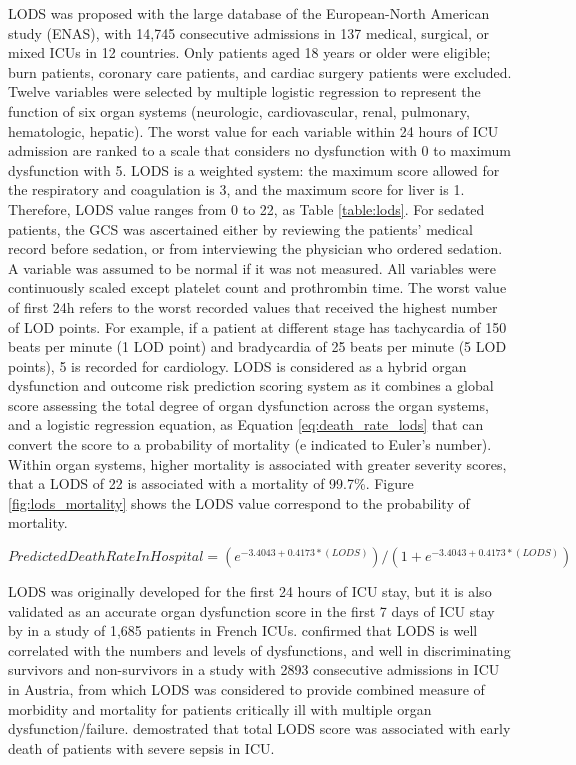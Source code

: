 \documentclass[12pt,a4paper,english
]{tunithesis}
\begin{document}
LODS was proposed with the large database of the European-North American study (ENAS), with 14,745 consecutive admissions in 137 medical, surgical, or mixed ICUs in 12 countries. Only patients aged 18 years or older were eligible; burn patients, coronary care patients, and cardiac surgery patients were excluded. Twelve variables were selected by multiple logistic regression to represent the function of six organ systems (neurologic, cardiovascular, renal, pulmonary, hematologic, hepatic). The worst value for each variable within 24 hours of ICU admission are ranked to a scale that considers no dysfunction with 0 to maximum dysfunction with 5. LODS is a weighted system: the maximum score allowed for the respiratory and coagulation is 3, and the maximum score for liver is 1. Therefore, LODS value ranges from 0 to 22, as Table \ref{table:lods}. For sedated patients, the GCS was ascertained either by reviewing the patients' medical record before sedation, or from interviewing the physician who ordered sedation. A variable was assumed to be normal if it was not measured. All variables were continuously scaled except platelet count and prothrombin time. The worst value of first 24h refers to the worst recorded values that received the highest number of LOD points. For example, if a patient at different stage has tachycardia of 150 beats per minute (1 LOD point) and bradycardia of 25 beats per minute (5 LOD points), 5 is recorded for cardiology. LODS is considered as a hybrid organ dysfunction and outcome risk prediction scoring system as it combines a global score assessing the total degree of organ dysfunction across the organ systems, and a logistic regression equation, as Equation \ref{eq:death_rate_lods} that can convert the score to a probability of mortality (e indicated to Euler's number). Within organ systems, higher mortality is associated with greater severity scores, that a LODS of 22 is associated with a mortality of 99.7\%. Figure \ref{fig:lods_mortality} shows the LODS value correspond to the probability of mortality. \parencite{Tiffany21, Vincent2010, sekulic2015} 

\begin{equation}
\label{eq:death_rate_lods}
Predicted Death Rate In Hospital = (e^{-3.4043 + 0.4173*(LODS)} ) / ( 1 +  e^{-3.4043 + 0.4173*(LODS)} )
\end{equation}

LODS was originally developed for the first 24 hours of ICU stay, but it is also validated as an accurate organ dysfunction score in the first 7 days of ICU stay by \textcite{Timsit2002} in a study of 1,685 patients in French ICUs. \textcite{Metnitz2001} confirmed that LODS is well correlated with the numbers and levels of dysfunctions, and well in discriminating survivors and non-survivors in a study with 2893 consecutive admissions in ICU in Austria, from which LODS was considered to provide combined measure of morbidity and mortality for patients critically ill with multiple organ dysfunction/failure. \textcite{Blanco2008}  demostrated that total LODS score was associated with early death of patients with severe sepsis in ICU.
\end{document}

